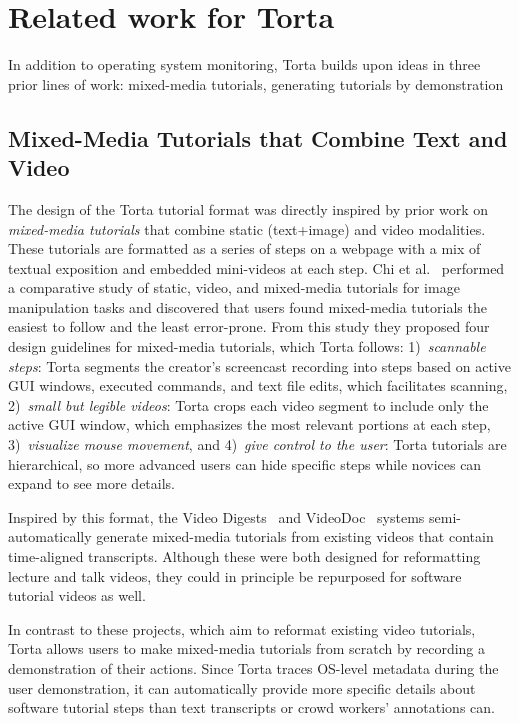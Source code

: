 \section{Related work for Torta}

In addition to operating system monitoring, Torta builds upon ideas 
in three prior lines of work: mixed-media tutorials, generating tutorials 
by demonstration

\subsection{Mixed-Media Tutorials that Combine Text and Video}

The design of the Torta tutorial format was directly inspired by prior
work on \emph{mixed-media tutorials} that combine static (text+image)
and video modalities. These tutorials are formatted as a series of steps
on a webpage with a mix of textual exposition and embedded mini-videos
at each step. Chi et al.~\cite{Chi2012} performed a comparative study of
static, video, and mixed-media tutorials for image manipulation tasks
and discovered that users found mixed-media tutorials the easiest to
follow and the least error-prone. From this study they proposed four
design guidelines for mixed-media tutorials, which Torta follows:
1)~\emph{scannable steps}: Torta segments the creator's screencast
recording into steps based on active GUI windows, executed commands, and
text file edits, which facilitates scanning, 2)~\emph{small but legible
videos}: Torta crops each video segment to include only the active GUI
window, which emphasizes the most relevant portions at each step,
3)~\emph{visualize mouse movement}, and 4)~\emph{give control to the
user}: Torta tutorials are hierarchical, so more advanced users can hide
specific steps while novices can expand to see more details.

Inspired by this format, the Video Digests~\cite{Pavel2014} and
VideoDoc~\cite{Krosnick2014} systems semi-automatically generate
mixed-media tutorials from existing videos that contain time-aligned
transcripts. Although these were both designed for reformatting
lecture and talk videos, they could in principle be repurposed for
software tutorial videos as well.

In contrast to these projects, which aim to reformat existing video
tutorials, Torta allows users to make mixed-media tutorials from scratch
by recording a demonstration of their actions. Since Torta traces
OS-level metadata during the user demonstration, it can automatically
provide more specific details about software tutorial steps than text
transcripts or crowd workers' annotations can.


